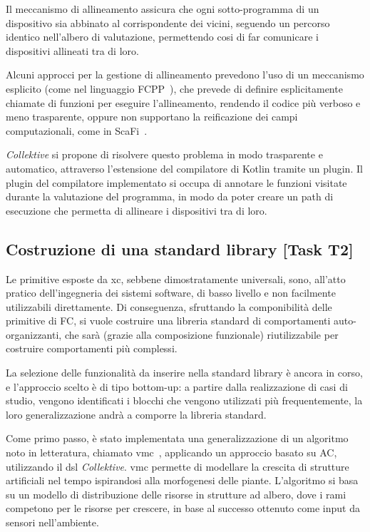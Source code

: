 \documentclass[13pt, a4paper]{article}
\newcommand{\ck}{\emph{Collektive}}
\begin{document}
Il meccanismo di allineamento assicura che ogni sotto-programma di un dispositivo sia abbinato al corrispondente dei vicini,
    seguendo un percorso identico nell'albero di valutazione,
    permettendo cosi di far comunicare i dispositivi allineati tra di loro.

Alcuni approcci per la gestione di allineamento prevedono l'uso di un meccanismo esplicito (come nel linguaggio FCPP~\cite{FCPP}),
che prevede di definire esplicitamente chiamate di funzioni per eseguire l'allineamento,
rendendo il codice più verboso e meno trasparente,
oppure non supportano la reificazione dei campi computazionali, come in ScaFi~\cite{ScaFi}.

\ck{} si propone di risolvere questo problema in modo trasparente e automatico, attraverso l'estensione del compilatore di Kotlin
tramite un plugin.
%
Il plugin del compilatore implementato si occupa di annotare le funzioni visitate durante la valutazione del programma,
in modo da poter creare un path di esecuzione che permetta di allineare i dispositivi tra di loro.

\subsection{Costruzione di una standard library [Task T2]}\label{subsec:task-t2-[costruzione-di-una-standard-library]}

Le primitive esposte da \ac{xc}, sebbene dimostratamente universali,
sono, all'atto pratico dell'ingegneria dei sistemi software,
di basso livello e non facilmente utilizzabili direttamente.
%
Di conseguenza, sfruttando la componibilità delle primitive di \ac{FC},
si vuole costruire una libreria standard di comportamenti auto-organizzanti,
che sarà (grazie alla composizione funzionale) riutilizzabile per costruire comportamenti più complessi.

La selezione delle funzionalità da inserire nella standard library
è ancora in corso,
e l'approccio scelto è di tipo bottom-up:
a partire dalla realizzazione di casi di studio,
vengono identificati i blocchi che vengono utilizzati più frequentemente,
la loro generalizzazione andrà a comporre la libreria standard.

Come primo passo,
è stato implementata una generalizzazione di un algoritmo noto in letteratura,
chiamato \ac{vmc}~\cite{ZahadatHS17},
applicando un approccio basato su \ac{AC}, utilizzando il \ac{dsl} \ck{}.
%
\ac{vmc} permette di modellare la crescita di strutture artificiali nel tempo ispirandosi alla morfogenesi delle piante.
%
L'algoritmo si basa su un modello di distribuzione delle risorse in strutture ad albero,
    dove i rami competono per le risorse per crescere, in base al successo ottenuto come input da sensori nell'ambiente.
\end{document}
